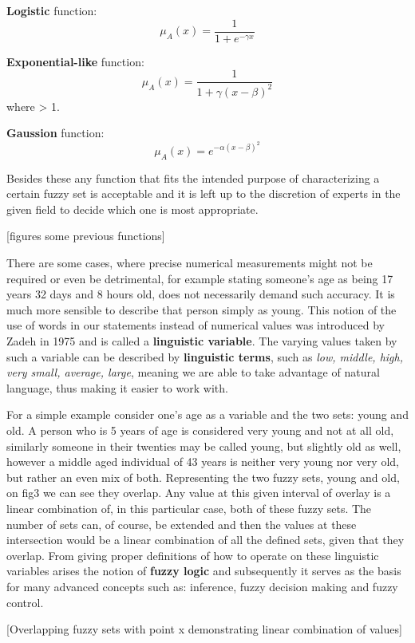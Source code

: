 \textbf{Logistic} function:
\[
	\mu_{A}(x) = \frac{1}{1 + e^{-\gamma x}}
\]

\textbf{Exponential-like} function:
\[
	\mu_{A}(x) = \frac{1}{1 + \gamma(x - \beta)^2}
\]
where \gamma > 1.

\textbf{Gaussion} function:
\[
	\mu_{A}(x) = e^{-\alpha (x - \beta)^2}
\]

Besides these any function that fits the intended purpose of characterizing a certain fuzzy set is acceptable and it is left up to the discretion of experts in the given field to decide which one is most appropriate.

[figures some previous functions]

There are some cases, where precise numerical measurements might not be required or even be detrimental, for example stating someone's age as being 17 years 32 days and 8 hours old, does not necessarily demand such accuracy. It is much more sensible to describe that person simply as young. This notion of the use of words in our statements instead of numerical values was introduced by Zadeh in 1975 and is called a \textbf{linguistic variable}. The varying values taken by such a variable can be described by \textbf{linguistic terms}, such as \textit{low, middle, high, very small, average, large}, meaning we are able to take advantage of natural language, thus making it easier to work with.

For a simple example consider one's age as a variable and the two sets: young and old. A person who is 5 years of age is considered very young and not at all old, similarly someone in their twenties may be called young, but slightly old as well, however a middle aged individual of 43 years is neither very young nor very old, but rather an even mix of both. Representing the two fuzzy sets, young and old, on fig3 we can see they overlap. Any value at this given interval of overlay is a linear combination of, in this particular case, both of these fuzzy sets. The number of sets can, of course, be extended and then the values at these intersection would be a linear combination of all the defined sets, given that they overlap. From giving proper definitions of how to operate on these linguistic variables arises the notion of \textbf{fuzzy logic} and subsequently it serves as the basis for many advanced concepts such as: inference, fuzzy decision making and fuzzy control.

[Overlapping fuzzy sets with point x demonstrating linear combination of values]
\begin{figure}[!h]
\centering
\end{figure}

